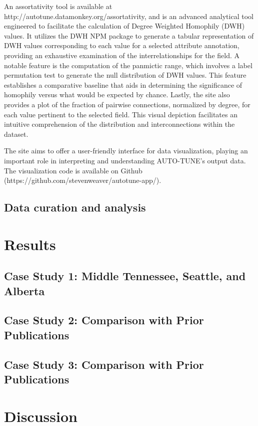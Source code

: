 \documentclass[utf8]{FrontiersinHarvard} %
\begin{document}
An assortativity tool is available at http://autotune.datamonkey.org/assortativity, and is an advanced analytical tool engineered to facilitate the calculation of Degree Weighted Homophily (DWH) values. It utilizes the DWH NPM package to generate a tabular representation of DWH values corresponding to each value for a selected attribute annotation, providing an exhaustive examination of the interrelationships for the field.
A notable feature is the computation of the panmictic range, which involves a label permutation test to generate the null distribution of DWH values. This feature establishes a comparative baseline that aids in determining the significance of homophily versus what would be expected by chance.
Lastly, the site also provides a plot of the fraction of pairwise connections, normalized by degree, for each value pertinent to the selected field. This visual depiction facilitates an intuitive comprehension of the distribution and interconnections within the dataset.

The site aims to offer a user-friendly interface for data visualization, playing an important role in interpreting and understanding AUTO-TUNE's output data. The visualization code is available on Github (https://github.com/stevenweaver/autotune-app/).

\subsection{Data curation and analysis}

\section{Results}

\subsection{Case Study 1: Middle Tennessee, Seattle, and Alberta}

\subsection{Case Study 2: Comparison with Prior Publications}

\subsection{Case Study 3: Comparison with Prior Publications}


\section{Discussion}
\end{document}
